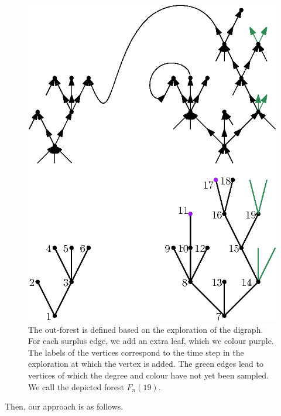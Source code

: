 \begin{figure}
    \centering
    \includegraphics[scale=0.8]{Content/Pictures/configuration_model_out_forest.eps}
    \caption{The out-forest is defined based on the exploration of the digraph. For each surplus edge, we add an extra leaf, which we colour purple. The labels of the vertices correspond to the time step in the exploration at which the vertex is added. The green edges lead to vertices of which the degree and colour have not yet been sampled. We call the depicted forest $\hat{F}_n(19)$.}
    \label{fig.configuration modeloutforest}
\end{figure}
Then, our approach is as follows.
